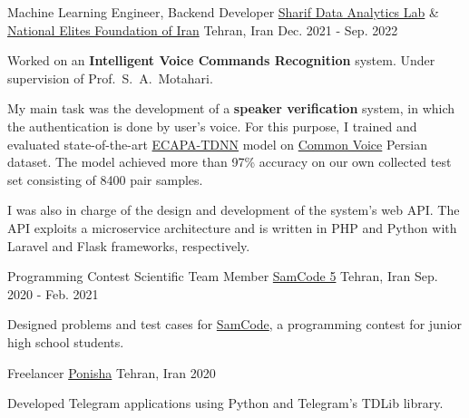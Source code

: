 \begin{cventries}
  \cventry
    {Machine Learning Engineer, Backend Developer} %
    {\href{https://www.sharif.edu/}{Sharif Data Analytics Lab} \& \href{https://en.bmn.ir/}{National Elites Foundation of Iran}} %
    {Tehran, Iran} %
    {Dec. 2021 - Sep. 2022} %
    {
      \begin{cvitems} %
        \item {Worked on an \textbf{Intelligent Voice Commands Recognition} system. Under supervision of Prof.~S.~A.~Motahari.}
        \item {My main task was the development of a \textbf{speaker verification} system, in which the authentication is done by user's voice. For this purpose, I trained and evaluated state-of-the-art \href{https://arxiv.org/abs/2005.07143}{ECAPA-TDNN} model on \href{https://commonvoice.mozilla.org}{Common Voice} Persian dataset. The model achieved more than 97\% accuracy on our own collected test set consisting of 8400 pair samples.} %
        \item{I was also in charge of the design and development of the system's web API.%
        The API exploits a microservice architecture and is written in PHP and Python with Laravel and Flask frameworks, respectively.}
      \end{cvitems}
    }

  \cventry
    {Programming Contest Scientific Team Member} %
    {\href{https://samcode.allamehelli3.ir/staff.html}{SamCode 5}} %
    {Tehran, Iran} %
    {Sep. 2020 - Feb. 2021} %
    {
      \begin{cvitems} %
        \item {Designed problems and test cases for {\href{https://samcode.allamehelli3.ir/}{SamCode}}, a programming contest for junior high school students.}
      \end{cvitems}
    }

  \cventry
    {Freelancer} %
    {\href{https://ponisha.ir/profile/radinshayanfar}{Ponisha}} %
    {Tehran, Iran} %
    {2020} %
    {
      \begin{cvitems} %
        \item {Developed Telegram applications using Python and Telegram’s TDLib library.}
      \end{cvitems}
    }

\end{cventries}

